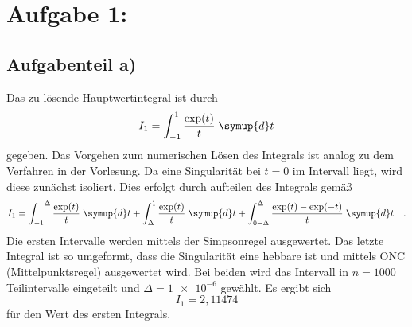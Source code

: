 \section*{Aufgabe 1: }

\subsection*{Aufgabenteil a)}
Das zu lösende Hauptwertintegral ist durch
\begin{equation*}
  I_1= \int_{-1}^1 \frac{\exp({t})}{t} \; \symup{d}t
\end{equation*}
gegeben. Das Vorgehen zum numerischen Lösen des Integrals ist analog zu dem Verfahren in der Vorlesung.
Da eine Singularität bei $t=0$ im Intervall liegt, wird diese zunächst isoliert.
Dies erfolgt durch aufteilen des Integrals gemäß
\begin{equation*}
    I_1 = \int_{-1}^{-\Delta} \frac{\exp(t)}{t}\; \symup{d}t + \int_{\Delta}^{1} \frac{\exp({t})}{t}\; \symup{d}t +\int_{0-\Delta}^{\Delta} \frac{\exp(t)-\exp(-t)}{t} \;\symup{d}t \quad .
\end{equation*}
Die ersten Intervalle werden mittels der Simpsonregel ausgewertet. Das letzte Integral ist so umgeformt, dass die Singularität eine hebbare ist und mittels ONC (Mittelpunktsregel) ausgewertet wird. Bei beiden wird das Intervall in $n=1000$ Teilintervalle eingeteilt und $\Delta=\num{1e-6}$ gewählt.
Es ergibt sich
\begin{equation*}
  I_1=2,11474
\end{equation*}
für den Wert des ersten Integrals.
